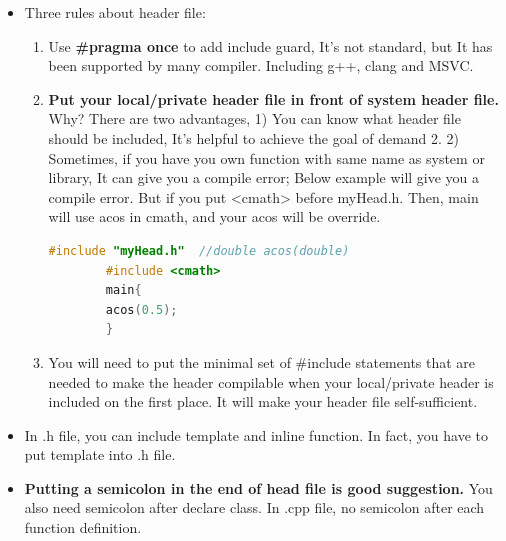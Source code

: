 \documentclass[a4paper,12pt,twoside]{book}
\begin{document}
\begin{itemize}
	\item Three rules about header file:
	
	\begin{enumerate}
		\item Use \textbf{\#pragma once} to add include guard, It's not standard, but It has been supported by many compiler. Including g++, clang and MSVC.
		
		\item \textbf{Put your local/private header file in front of system header file. }  Why? There are two advantages, 1) You can know what header file should be included, It's helpful to achieve the goal of demand 2.  2) Sometimes, if you have you own function with same name as system or library, It can give you a compile error; Below example will give you a compile error. But if you put <cmath> before myHead.h. Then, main will use acos in cmath, and your acos will be override.
		
		\begin{lstlisting}[frame=single, language=c++]
		#include "myHead.h"  //double acos(double)
		#include <cmath>
		main{
		acos(0.5);
		}
		\end{lstlisting}
		
		\item You will need to put the minimal set of \#include statements that are needed to make the header compilable when your local/private header is included on the first place.  It will make your header file self-sufficient.
	\end{enumerate}
	
	\item In .h file, you can include template and inline function.  In fact, you have to put template into .h file. 
	
	\item \textbf{Putting a semicolon in the end of head file is good suggestion.} You also need semicolon after declare class. In .cpp file, no semicolon after each function definition.
	
\end{itemize}
\end{document}
